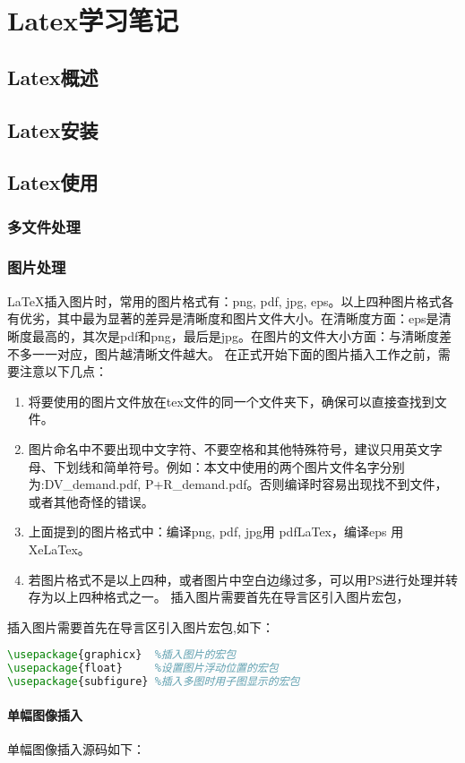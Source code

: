 \documentclass[../main.tex]{subfiles}
\begin{document}
\chapter{Latex学习笔记}
\section{Latex概述}
\section{Latex安装}
\section{Latex使用}
\subsection{多文件处理}
\subsection{图片处理}
LaTeX插入图片时，常用的图片格式有：png, pdf, jpg, eps。以上四种图片格式各有优劣，其中最为显著的差异是清晰度和图片文件大小。在清晰度方面：eps是清晰度最高的，其次是pdf和png，最后是jpg。在图片的文件大小方面：与清晰度差不多一一对应，图片越清晰文件越大。
在正式开始下面的图片插入工作之前，需要注意以下几点：
\begin{enumerate}
    \item 将要使用的图片文件放在tex文件的同一个文件夹下，确保可以直接查找到文件。
    \item 图片命名中不要出现中文字符、不要空格和其他特殊符号，建议只用英文字母、下划线和简单符号。例如：本文中使用的两个图片文件名字分别为:DV\_demand.pdf, P+R\_demand.pdf。否则编译时容易出现找不到文件，或者其他奇怪的错误。
    \item 上面提到的图片格式中：编译png, pdf, jpg用 pdfLaTex，编译eps 用XeLaTex。
    \item 若图片格式不是以上四种，或者图片中空白边缘过多，可以用PS进行处理并转存为以上四种格式之一。
          插入图片需要首先在导言区引入图片宏包，
\end{enumerate}
插入图片需要首先在导言区引入图片宏包,如下：
\begin{lstlisting}[language=tex]
\usepackage{graphicx}  %插入图片的宏包
\usepackage{float}     %设置图片浮动位置的宏包
\usepackage{subfigure} %插入多图时用子图显示的宏包  
\end{lstlisting}
\subsubsection{单幅图像插入}
单幅图像插入源码如下：
\end{document}
